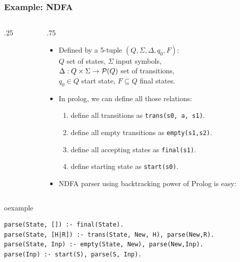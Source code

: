\begin{frame}[fragile]
\frametitle{Example: NDFA}
\begin{columns}
\begin{column}{.25\textwidth}
\tiny
{}
\end{column}
\begin{column}{.75\textwidth}
\small
\begin{itemize}
\item Defined by a 5-tuple $(Q, \Sigma, \Delta , q_0, F)$:\\
$Q$ set of states, $\Sigma$ input symbols,\\
 $\Delta: Q \times \Sigma \rightarrow {\cal P}(Q)$
set of transitions,\\
$q_0 \in Q$ start state, $F \subseteq Q$ final states.
\item In prolog, we can define all those relations:\\
    \begin{enumerate}\scriptsize
    \item define all transitions as \lstinline!trans(s0, a, s1)!.
    \item define all empty transitions as \lstinline!empty(s1,s2)!.
    \item define all accepting states as \lstinline!final(s1)!.
    \item define starting state as \lstinline!start(s0)!.
    \end{enumerate}
\item NDFA parser using backtracking power of Prolog is easy:
\end{itemize}
\end{column}
\end{columns}
\begin{beamercolorbox}{oexample}
\begin{lstlisting}[basicstyle=\scriptsize\ttfamily]
parse(State, []) :- final(State).
parse(State, [H|R]) :- trans(State, New, H), parse(New,R).
parse(State, Inp) :- empty(State, New), parse(New,Inp).
parse(Inp) :- start(S), parse(S, Inp).
\end{lstlisting}
\end{beamercolorbox}
\end{frame}


